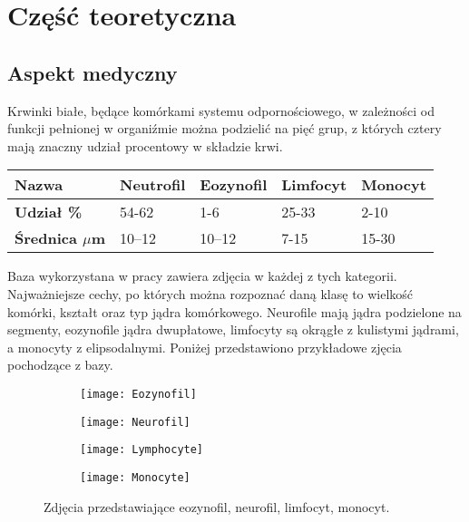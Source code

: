 \chapter{Część teoretyczna}
\label{cha:teoria}

\section{Aspekt medyczny}
Krwinki białe, będące komórkami systemu odpornościowego, w zależności od funkcji pełnionej w organiźmie można podzielić na pięć grup, z których cztery mają znaczny udział procentowy w składzie krwi.
\begin{table}[h]
\centering
\begin{tabular}{|l|l|l|l|l|}
\hline
\textbf{Nazwa}                               & Neutrofil & Eozynofil & Limfocyt & Monocyt \\ \hline
\textbf{Udział \%}\cite{lymphocytes_percentage} & 54-62   & 1-6    & 25-33  & 2-10  \\ \hline
\textbf{Średnica  \textbf{$\mu$}m}\cite{Wheater1979FunctionalHA} & 10–12  & 10–12 & 7-15  & 15-30  \\ \hline
\end{tabular}
\end{table}

Baza wykorzystana w pracy zawiera zdjęcia w każdej z tych kategorii. Najważniejsze cechy, po których można rozpoznać daną klasę to wielkość komórki, kształt oraz typ jądra komórkowego. Neurofile mają jądra podzielone na segmenty, eozynofile jądra dwupłatowe, limfocyty są okrągłe z kulistymi jądrami, a monocyty z elipsodalnymi. \cite{lymphocytes_nucleus} Poniżej przedstawiono przykładowe zjęcia pochodzące z bazy.

\begin{figure}[h]
	\centering
	\begin{subfigure}{0.35\textwidth}
		\centering
		\texttt{[image: Eozynofil]}
		\subcaption{\label{subfigure_a}}
	\end{subfigure}
	\begin{subfigure}{0.35\textwidth}
		\centering
		\texttt{[image: Neurofil]}
		\subcaption{\label{subfigure_b}}
	\end{subfigure}
	\begin{subfigure}{0.35\textwidth}
		\centering
		\texttt{[image: Lymphocyte]}
		\subcaption{\label{subfigure_c}}
	\end{subfigure}
	\begin{subfigure}{0.35\textwidth}
		\centering
		\texttt{[image: Monocyte]}
		\subcaption{\label{subfigure_d}}
	\end{subfigure}
	
	\caption{\label{fig:subcaption_example}Zdjęcia przedstawiające \protect{} eozynofil, \protect{} neurofil,  \protect{} limfocyt,  \protect{} monocyt.}
\end{figure}

